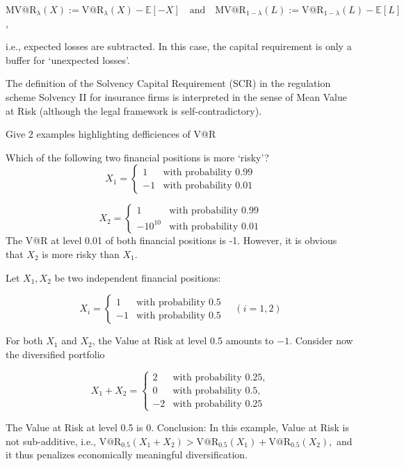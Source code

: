 {\(\text{MV@R}_\lambda(X) := \text{V@R}_\lambda(X) - \mathbb{E}[-X] \quad \text{and} \quad \text{MV@R}_{1-\lambda}(L) := \text{V@R}_{1-\lambda}(L) - \mathbb{E}[L]\),

i.e., expected losses are subtracted.
In this case, the capital requirement is only a buffer for ‘unexpected losses’.

The definition of the Solvency Capital Requirement (SCR) in the regulation scheme Solvency II 
for insurance firms is interpreted in the sense of Mean Value at Risk (although the legal framework is self-contradictory).


Give 2 examples highlighting defficiences of V@R 

Which of the following two financial positions is more ‘risky’?
\[
X_1 = \begin{cases} 
1 & \text{with probability } 0.99 \\ 
-1 & \text{with probability } 0.01 
\end{cases}
\]

\[
X_2 = \begin{cases} 
1 & \text{with probability } 0.99 \\ 
-10^{10} & \text{with probability } 0.01 
\end{cases}
\]
The V@R at level 0.01 of both financial positions is -1. However, it is obvious that \(X_2\) is more risky than \(X_1\).

Let \(X_1, X_2\) be two independent financial positions:

\[X_i =
\begin{cases} 
1 & \text{with probability } 0.5 \\ 
-1 & \text{with probability } 0.5 
\end{cases} \quad (i = 1, 2)\]

For both \(X_1\) and \(X_2\), the Value at Risk at level 0.5 amounts to \(-1\).
Consider now the diversified portfolio

\[X_1 + X_2 = 
\begin{cases} 
2 & \text{with probability } 0.25, \\ 
0 & \text{with probability } 0.5, \\ 
-2 & \text{with probability } 0.25 
\end{cases}\]

The Value at Risk at level 0.5 is 0.
Conclusion: In this example, Value at Risk is not sub-additive, i.e.,
\(\text{V@R}_{0.5}(X_1 + X_2) > \text{V@R}_{0.5}(X_1) + \text{V@R}_{0.5}(X_2),\)
and it thus penalizes economically meaningful diversification.


}

